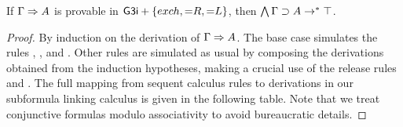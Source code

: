 \begin{theorem}
  If $\Gamma \Rightarrow A$ is provable in $\text{\sys{G3i}} + \{exch, {=}R, {=}L\}$,
  then $\bigwedge \Gamma \supset A \rightarrow^\ast \top$.
\end{theorem}
\begin{proof}
  By induction on the derivation of $\Gamma \Rightarrow A$. The base case simulates the
  rules {}, {}, {} and {}. Other rules
  are simulated as usual by composing the derivations obtained from the
  induction hypotheses, making a crucial use of the release rules {}
  and {}. The full mapping from sequent calculus rules to
  derivations in our subformula linking calculus is given in the following
  table. Note that we treat conjunctive formulas modulo associativity to avoid
  bureaucratic details.


\end{proof}
